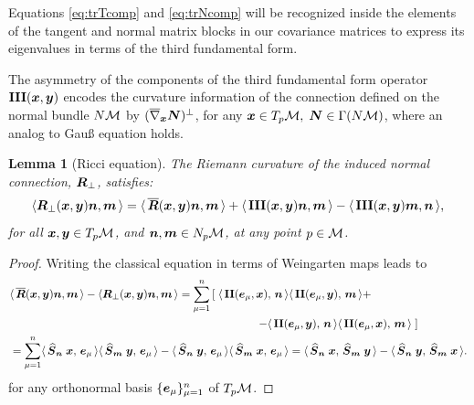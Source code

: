 \documentclass[letterpaper, reqno, 11pt]{amsart}
\newtheorem{lemma}[theorem]{Lemma}
\theoremstyle{definition}
\theoremstyle{remark}
\numberwithin{equation}{section}
\begin{document}
Equations \ref{eq:trTcomp} and \ref{eq:trNcomp} will be recognized inside the elements of the tangent and normal matrix blocks in our covariance matrices to express its eigenvalues in terms of the third fundamental form.

The asymmetry of the components of the third fundamental form operator $\III(\bx,\by)$ encodes the curvature information of the connection defined on the normal bundle $N\cM$ by $(\bar{\nabla}_{\bx}\bs{N})^\perp$, for any $\bx\in T_p\cM,\;\bs{N}\in \Gamma(N\cM)$, where an analog to Gau{\ss} equation holds.

\begin{lemma}[Ricci equation]
	The Riemann curvature of the induced normal connection, $\bR_\perp$, satisfies:
\begin{equation}
	\langle\bR_\perp(\bx,\by)\bN,\bM\,\rangle =\langle\,\bar{\bR}(\bx,\by)\bN,\bM\,\rangle + \langle\,\III(\bx,\by)\bN,\bM\,\rangle - \langle\,\III(\bx,\by)\bM,\bN\,\rangle ,
\end{equation}
for all $\bx,\by\in T_p\cM$, and $\bN,\bM\in N_p\cM$, at any point $p\in\cM$.
\end{lemma}
\begin{proof}
Writing the classical equation \cite[Ex. II.11]{chavel2006} in terms of Weingarten maps leads to
\begin{align*}
& \langle\,\bar{\bR}(\bx,\by)\bN,\bM\,\rangle -\langle\bR_\perp(\bx,\by)\bN,\bM\,\rangle =\sum_{\mu=1}^n\left[\; \metric{\II(\bE_\mu,\bx)}{\bN}\metric{\II(\bE_\mu,\by)}{\bM} +\right. \\ & \qquad\qquad\qquad\qquad\qquad\qquad\qquad\qquad\qquad\qquad\qquad \left. - \metric{\II(\bE_\mu,\by)}{\bN}\metric{\II(\bE_\mu,\bx)}{\bM}\; \right] \\
& =\sum_{\mu=1}^n \metric{\oS_{\bN}\;\bx}{\bE_\mu} \metric{\oS_{\bM}\;\by}{\bE_\mu} - \metric{\oS_{\bN}\;\by}{\bE_\mu} \metric{\oS_{\bM}\;\bx}{\bE_\mu} = \metric{\oS_{\bN}\;\bx}{\oS_{\bM}\;\by} - \metric{\oS_{\bN}\;\by}{\oS_{\bM}\;\bx}.
\end{align*}
for any orthonormal basis $\{\bE_\mu\}_{\mu=1}^n$ of $T_p\cM$.
\end{proof}



\end{document}
